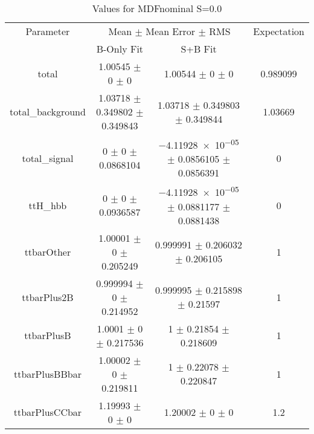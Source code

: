 \begin{table}
\centering
\caption{Values for MDFnominal S=0.0}
\begin{tabular}{cccc}
\toprule
Parameter & \multicolumn{2}{c}{Mean $\pm$ Mean Error $\pm$ RMS} & Expectation\\
 & B-Only Fit & S+B Fit & \\
\midrule
total & \num{1.00545} $\pm$ \num{0} $\pm$ \num{0} & \num{1.00544} $\pm$ \num{0} $\pm$ \num{0} & \num{0.989099}\\
total\_background & \num{1.03718} $\pm$ \num{0.349802} $\pm$ \num{0.349843} & \num{1.03718} $\pm$ \num{0.349803} $\pm$ \num{0.349844} & \num{1.03669}\\
total\_signal & \num{0} $\pm$ \num{0} $\pm$ \num{0.0868104} & \num{-4.11928e-05} $\pm$ \num{0.0856105} $\pm$ \num{0.0856391} & \num{0}\\
ttH\_hbb & \num{0} $\pm$ \num{0} $\pm$ \num{0.0936587} & \num{-4.11928e-05} $\pm$ \num{0.0881177} $\pm$ \num{0.0881438} & \num{0}\\
ttbarOther & \num{1.00001} $\pm$ \num{0} $\pm$ \num{0.205249} & \num{0.999991} $\pm$ \num{0.206032} $\pm$ \num{0.206105} & \num{1}\\
ttbarPlus2B & \num{0.999994} $\pm$ \num{0} $\pm$ \num{0.214952} & \num{0.999995} $\pm$ \num{0.215898} $\pm$ \num{0.21597} & \num{1}\\
ttbarPlusB & \num{1.0001} $\pm$ \num{0} $\pm$ \num{0.217536} & \num{1} $\pm$ \num{0.21854} $\pm$ \num{0.218609} & \num{1}\\
ttbarPlusBBbar & \num{1.00002} $\pm$ \num{0} $\pm$ \num{0.219811} & \num{1} $\pm$ \num{0.22078} $\pm$ \num{0.220847} & \num{1}\\
ttbarPlusCCbar & \num{1.19993} $\pm$ \num{0} $\pm$ \num{0} & \num{1.20002} $\pm$ \num{0} $\pm$ \num{0} & \num{1.2}\\
\bottomrule
\end{tabular}
\end{table}